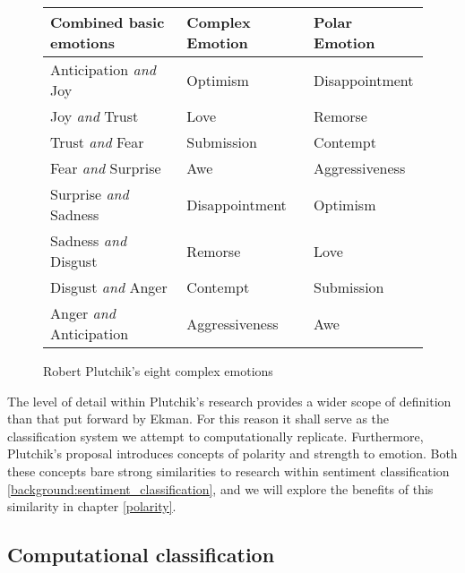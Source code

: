 \begin{figure}[h!]
	\caption{Robert Plutchik's eight complex emotions}
	\label{fig:eight-complex-emotions}
	\centering
	\begin{tabular}{ | l | l | l | }
		\hline
		Combined basic emotions & Complex Emotion & Polar Emotion \\
		\hline 
		Anticipation \emph{and} Joy & Optimism & Disappointment \\
		Joy \emph{and} Trust & Love & Remorse \\
		Trust \emph{and} Fear & Submission & Contempt \\
		Fear \emph{and} Surprise & Awe & Aggressiveness \\
		Surprise \emph{and} Sadness & Disappointment & Optimism \\
		Sadness \emph{and} Disgust & Remorse & Love \\
		Disgust \emph{and} Anger & Contempt & Submission \\
		Anger \emph{and} Anticipation & Aggressiveness & Awe \\
		\hline
	\end{tabular}
\end{figure}

The level of detail within Plutchik's research provides a wider scope of definition than that put forward by Ekman. For this reason it shall serve as the classification system we attempt to computationally replicate. Furthermore, Plutchik's proposal introduces concepts of polarity and strength to emotion. Both these concepts bare strong similarities to research within sentiment classification \ref{background:sentiment_classification}, and we will explore the benefits of this similarity in chapter \ref{polarity}.

\subsection{Computational classification}

\begin{comment}

As discussed in section \ref{background:sentiment_analysis}, research into sentiment analysis has largely focussed on the polarity of sentiment i.e. is it negative or positive. 

Emotions from text \cite{Alm:2005vc}
	- application for reading with emotion

Real world knowledge for affect sensing \cite{Liu:2003ts}

Twitter and emotion \cite{Bollen:2009wva}

\end{comment}

